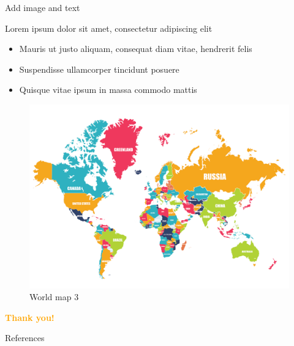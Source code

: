 \documentclass{beamer}
\begin{document}
\begin{frame}{Add image and text}

Lorem ipsum dolor sit amet, consectetur adipiscing elit

	\begin{multicols}{2}
		
		\begin{itemize}
			\item Mauris ut justo aliquam, consequat diam vitae, hendrerit felis
			\item Suspendisse ullamcorper tincidunt posuere
			\item Quisque vitae ipsum in massa commodo mattis
		\end{itemize}
		\begin{figure}
			\centering
			\includegraphics[width=\linewidth]{img/world-map}
			\caption{World map 3}
			\label{fig:world-map3}
		\end{figure}
		
	\end{multicols}

\end{frame}

\begin{frame}
	\centering\Huge\textcolor{orange}{\textbf{Thank you!}}
\end{frame}

\begin{frame}{References}
	\begin{tiny}\end{tiny}
\end{frame}
\end{document}
